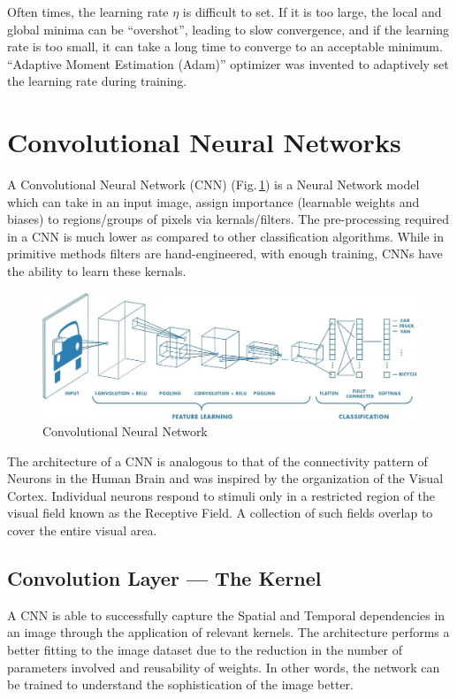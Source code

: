 Often times, the learning rate $\eta$ is difficult to set. If it is too large, the local and global minima can be “overshot”, leading to slow convergence, and if the learning rate is too small, it can take a long time to converge to an acceptable minimum. “Adaptive Moment Estimation (Adam)” \citep{adam} optimizer was invented to adaptively set the learning rate during training.


\section{Convolutional Neural Networks}
A Convolutional Neural Network (CNN) (Fig.\,\ref{cnn}) is a Neural Network model which can take in an input image, assign importance (learnable weights and biases) to regions/groups of pixels via kernals/filters. The pre-processing required in a CNN is much lower as compared to other classification algorithms. While in primitive methods filters are hand-engineered, with enough training, CNNs have the ability to learn these kernals.
\begin{figure}[h]
	\centering
	\includegraphics[width=\textwidth]{Figs/cnn.jpg}
    \caption{Convolutional Neural Network}
    \label{cnn}
\end{figure}

The architecture of a CNN is analogous to that of the connectivity pattern of Neurons in the Human Brain and was inspired by the organization of the Visual Cortex. Individual neurons respond to stimuli only in a restricted region of the visual field known as the Receptive Field. A collection of such fields overlap to cover the entire visual area.

\subsection{Convolution Layer — The Kernel}
A CNN is able to successfully capture the Spatial and Temporal dependencies in an image through the application of relevant kernels. The architecture performs a better fitting to the image dataset due to the reduction in the number of parameters involved and reusability of weights. In other words, the network can be trained to understand the sophistication of the image better.

